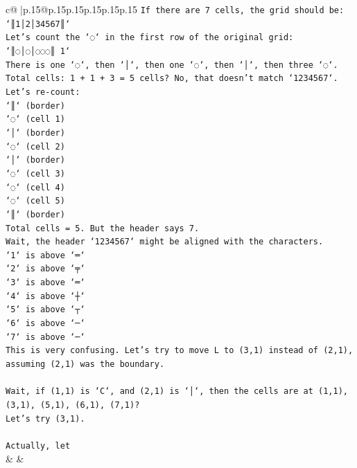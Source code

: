 \documentclass{article}
\begin{document}
{\begin{supertabular}{c@{$\;$}|p{.15\linewidth}@{}p{.15\linewidth}p{.15\linewidth}p{.15\linewidth}p{.15\linewidth}p{.15\linewidth}}
{{{\texttt{If there are 7 cells, the grid should be:} \\
\texttt{`║1│2│34567║`} \\
\texttt{Let's count the `◌` in the first row of the original grid:} \\
\texttt{`║◌│◌│◌◌◌║ 1`} \\
\texttt{There is one `◌`, then `│`, then one `◌`, then `│`, then three `◌`.} \\
\texttt{Total cells: 1 + 1 + 3 = 5 cells? No, that doesn't match `1234567`.} \\
\texttt{Let's re{-}count:} \\
\texttt{`║` (border)} \\
\texttt{`◌` (cell 1)} \\
\texttt{`│` (border)} \\
\texttt{`◌` (cell 2)} \\
\texttt{`│` (border)} \\
\texttt{`◌` (cell 3)} \\
\texttt{`◌` (cell 4)} \\
\texttt{`◌` (cell 5)} \\
\texttt{`║` (border)} \\
\texttt{Total cells = 5. But the header says 7.} \\
\texttt{Wait, the header `1234567` might be aligned with the characters.} \\
\texttt{`1` is above `═`} \\
\texttt{`2` is above `╤`} \\
\texttt{`3` is above `═`} \\
\texttt{`4` is above `┼`} \\
\texttt{`5` is above `┬`} \\
\texttt{`6` is above `─`} \\
\texttt{`7` is above `─`} \\
\texttt{This is very confusing. Let's try to move L to (3,1) instead of (2,1), assuming (2,1) was the boundary.} \\
\\ 
\texttt{Wait, if (1,1) is `C`, and (2,1) is `│`, then the cells are at (1,1), (3,1), (5,1), (6,1), (7,1)?} \\
\texttt{Let's try (3,1).} \\
\\ 
\texttt{Actually, let} \\
            }
        }
    }
    & & \\ \\


\end{supertabular}}
\end{document}
